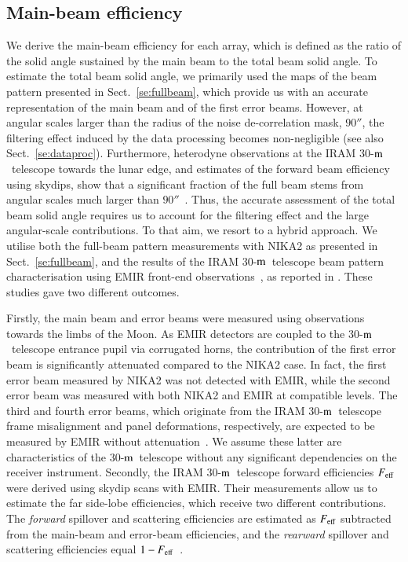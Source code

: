 \documentclass[traditionalabstract]{aa}
\newcommand{\trentemetre}{30-$\rm{m}$}
\newcommand{\rev}[1]{#1}
\begin{document}
{%

\subsection{Main-beam efficiency}
\label{se:beam_efficiency}

We derive the main-beam efficiency for each array, which is defined as the
ratio of the solid angle sustained by the main beam to the total beam
solid angle.
{\rev To estimate the total beam solid angle, we primarily used the maps
of the beam pattern presented in Sect.~\ref{se:fullbeam}, which
provide us with an accurate representation of the main beam and of the
first error beams. However, at angular scales larger than the radius
of the noise de-correlation mask, $90''$, the
filtering effect induced by the data processing becomes
non-negligible (see also Sect.~\ref{se:dataproc}). Furthermore,
heterodyne observations at the IRAM \trentemetre\ telescope
towards the lunar edge, and estimates of the forward beam efficiency using
skydips, show that a significant fraction of the full beam stems
from angular scales much larger than $90''$~\citep{Greve1998,
Kramer2013}. Thus, the accurate assessment of the total beam solid
angle requires us to account for the filtering effect and the large
angular-scale contributions. To that aim, we resort to a hybrid
approach. We utilise both the full-beam pattern measurements with
NIKA2 as presented in Sect.~\ref{se:fullbeam}, and the results of the
IRAM \trentemetre\ telescope beam pattern characterisation using EMIR
front-end observations~\citep{Carter2012}, as reported
in \citet{Kramer2013}. These studies gave two different outcomes.}

{\rev Firstly, the main beam and error beams were measured using
observations towards the limbs of the Moon. As EMIR detectors are coupled to
the \trentemetre\ telescope entrance pupil via corrugated horns, the
contribution of the first error beam is significantly attenuated
compared to the NIKA2 case. In fact, the first error beam measured by
NIKA2 was not detected with EMIR, while the second error beam was
measured with both NIKA2 and EMIR at compatible levels. The third and
fourth error beams, which originate from the IRAM \trentemetre\
telescope frame misalignment and panel deformations, respectively, are
expected to be measured by EMIR without
attenuation~\citep{Kramer2013}. We assume these latter are
characteristics of the \trentemetre\ telescope without any significant
dependencies on the receiver instrument.}
{\rev Secondly, the IRAM \trentemetre\ telescope forward efficiencies
$F_{\rm{eff}}$ were derived using skydip scans with EMIR. Their
measurements allow us to estimate the far side-lobe efficiencies,
which receive two different contributions. The \emph{forward}
spillover and scattering efficiencies are estimated as $F_{\rm{eff}}$
subtracted from the main-beam and error-beam efficiencies, and
the \emph{rearward} spillover and scattering efficiencies equal
$1-F_{\rm{eff}}$~\citep{Kramer2013}.}

}
\end{document}
